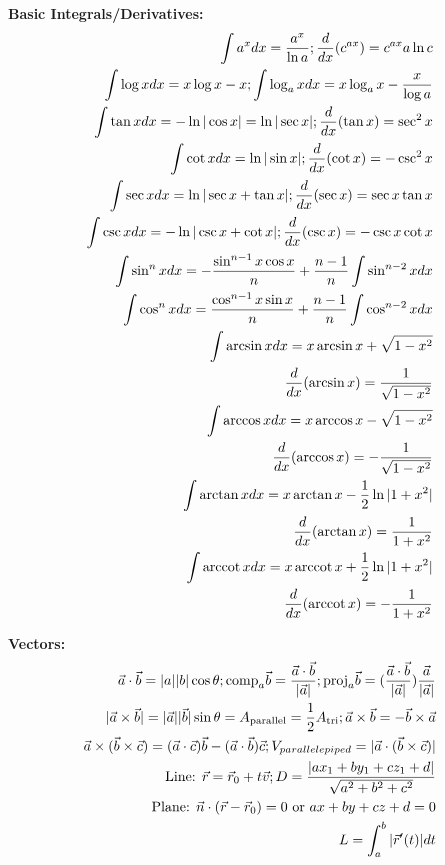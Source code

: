 \documentclass[twoside,draft]{article}
\DeclareMathOperator{\arccot}{arccot}
\begin{document}
\begin{multicols}{3}
  \textbf{Basic Integrals/Derivatives:}
  \begin{align*}
    \int a^x dx = {a^x \over \ln a} ;
    \frac{d}{dx}(c^{ax}) = c^{ax} a \ln c \\
    \int \log x dx = x \log x - x ;
    \int \log_a x dx = x \log_a x - {x \over \log a} \\
    \int \tan x dx = -\ln |\cos x| = \ln |\sec x| ;
    \frac{d}{dx}(\tan x) = \sec^2 x \\
    \int \cot x dx = \ln |\sin x| ;
    \frac{d}{dx}(\cot x) = -\csc^2 x \\
    \int \sec x dx = \ln |\sec x + \tan x| ;
    \frac{d}{dx}(\sec x) = \sec x \tan x \\
    \int \csc x dx = - \ln |\csc x + \cot x| ;
    \frac{d}{dx}(\csc x) = -\csc x \cot x \\
    \int \sin^n x dx = -{\sin^{n-1} x \cos x \over n} + {n-1 \over n} \int \sin^{n-2} x dx \\
    \int \cos^n x dx = {\cos^{n-1} x \sin x \over n} + {n-1 \over n} \int \cos^{n-2} x dx \\
    \int \arcsin x dx = x \arcsin x + \sqrt{1-x^2} \\
    \frac{d}{dx}(\arcsin x) = {1 \over \sqrt{1-x^2}} \\
    \int \arccos x dx = x \arccos x - \sqrt{1-x^2} \\
    \frac{d}{dx}(\arccos x) = -{1 \over \sqrt{1-x^2}} \\
    \int \arctan x dx = x \arctan x - {1 \over 2} \ln |1+x^2| \\
    \frac{d}{dx}(\arctan x) = {1 \over 1+x^2} \\
    \int \arccot x dx = x \arccot x + {1 \over 2} \ln |1+x^2| \\
    \frac{d}{dx}(\arccot x) = -{1 \over 1+x^2} \\
  \end{align*}

  \textbf{Vectors:}
  \begin{align*}
    \vec{a} \cdot \vec{b} = |a||b| \cos \theta; \text{comp}_a \vec{b} = {\vec{a} \cdot \vec{b} \over |\vec{a}|};
    \text{proj}_a \vec{b} = ({\vec{a} \cdot \vec{b} \over |\vec{a}|}){\vec{a} \over |\vec{a}|} \\
    |\vec{a} \times \vec{b}| = |\vec{a}| |\vec{b}| \sin \theta = A_{\text{parallel}} = {1 \over 2} A_{\text{tri}};
    \vec{a} \times \vec{b} = -\vec{b} \times \vec{a} \\
    \vec{a} \times (\vec{b} \times \vec{c}) = (\vec{a} \cdot \vec{c}) \vec{b} - (\vec{a} \cdot \vec{b}) \vec{c};
    V_{parallelepiped} = |\vec{a} \cdot (\vec{b} \times \vec{c})| \\
    \text{Line: } \vec{r} = \vec{r}_0 + t \vec{v}; D = \frac{|ax_1+by_1+cz_1+d|}{\sqrt{a^2+b^2+c^2}} \\
    \text{Plane: } \vec{n} \cdot (\vec{r} - \vec{r}_0) = 0 \text{ or } ax + by + cz + d = 0 \\
    L = \int_a^b |\vec{r}'(t)| dt \\
  \end{align*}


\end{multicols}
\end{document}
